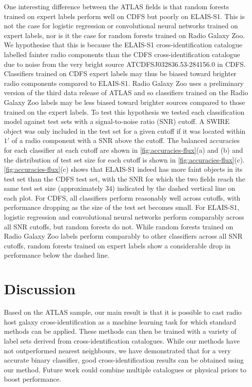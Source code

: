   One interesting difference between the ATLAS fields is that random forests
  trained on expert labels perform well on CDFS but poorly on ELAIS-S1. This
  is not the case for logistic regression or convolutional neural networks
  trained on expert labels, nor is it the case for random forests trained on
  Radio Galaxy Zoo. We hypothesise that this is because the ELAIS-S1
  cross-identification catalogue \citep{middelberg08} labelled fainter radio
  components than the CDFS cross-identification catalogue \citep{norris06} due
  to noise from the very bright source
  ATCDFS\textunderscore{}J032836.53-284156.0 in CDFS. Classifiers trained on
  CDFS expert labels may thus be biased toward brighter radio components
  compared to ELAIS-S1. Radio Galaxy Zoo uses a preliminary version of the third data release of ATLAS
  \citep{franzen15} and so classifiers trained on the Radio Galaxy Zoo labels
  may be less biased toward brighter sources compared to those trained on the
  expert labels. To test this hypothesis we tested each classification model against
  test sets with a signal-to-noise ratio (SNR) cutoff. A SWIRE object was only
  included in the test set for a given cutoff if it was located within $1'$ of
  a radio component with a SNR above the cutoff. The balanced accuracies for
  each classifier at each cutoff are shown in \autoref{fig:accuracies-flux}(a)
  and (b) and the distribution of test set size for each cutoff is shown in
  \autoref{fig:accuracies-flux}(c). \autoref{fig:accuracies-flux}(c) shows
  that ELAIS-S1 indeed has more faint objects in its test set than the CDFS test set, with the SNR for
  which the two fields reach the same test set size (approximately $34$)
  indicated by the dashed vertical line on each plot. For CDFS, all
  classifiers perform reasonably well across cutoffs, with performance
  dropping as the size of the test set becomes small. For ELAIS-S1, logistic
  regression and convolutional neural networks perform comparably across all
  SNR cutoffs, but random forests do not. While random forests trained on
  Radio Galaxy Zoo labels perform comparably to other classifiers across all
  SNR cutoffs, random forests trained on expert labels show a considerable
  drop in performance below the dashed line.

\section{Discussion}

  {Based on the ATLAS sample}, our main result is that it is possible
  to cast radio host galaxy cross-identification as a machine learning task
  for which standard methods can be applied. These methods can then be trained
  with a variety of label sets derived from cross-identification catalogues.
  While our methods have not outperformed nearest neighbours, we have demonstrated that
  for a very accurate binary classifier, good cross-identification results can
  be obtained using our method. Future work could combine multiple catalogues
  or physical priors to boost performance.

